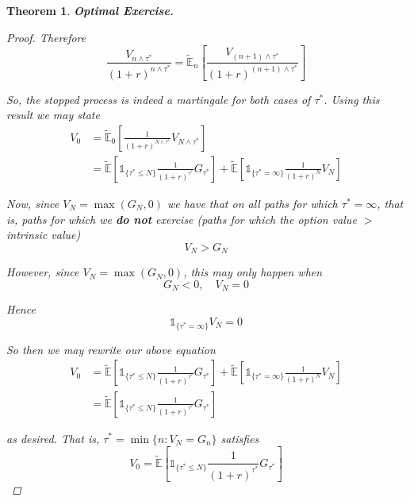 \documentclass[12pt]{article}
\newtheorem{theorem}{Theorem}
\newlength\tindent
\renewcommand{\indent}{\hspace*{\tindent}}
\newcommand{\E}{\mathbb E}
\begin{document}
\begin{theorem} {\bf Optimal Exercise.}
\begin{proof}
Therefore
\begin{equation*}
	\frac{ V_{n\land\tau^*} }{(1 + r)^{n\land\tau^*}} = \tilde{\E}_n\left[ \frac{V_{(n + 1)\land\tau^*}}{(1 + r)^{(n + 1)\land\tau^*}} \right]
\end{equation*}

\indent So, the stopped process is indeed a martingale for both cases of $\tau^*$. Using this result we may state
\begin{align*}
	V_0 &= \tilde{\E}_0 \left[ \frac{1}{(1 + r)^{N\land\tau^*}} V_{N\land\tau^*} \right] \\
	&= \tilde{\E} \left[ \mathds 1_{\{\tau^* \leq N \}} \frac{1}{(1 + r)^{\tau^*}} G_{\tau^*} \right] + \tilde{\E} \left[ \mathds 1_{\{\tau^* = \infty\}} \frac{1}{(1 + r)^N} V_N \right]
\end{align*}

\indent Now, since $V_N = \max(G_N, 0)$ we have that on all paths for which $\tau^* = \infty$, that is, paths for which we {\bf do not} exercise (paths for which the option value $>$ intrinsic value)
\begin{equation*}
	V_N > G_N
\end{equation*}

However, since $V_N = \max(G_N, 0)$, this may only happen when 
\begin{equation*}
	G_N < 0, \quad V_N = 0
\end{equation*}

Hence
\begin{equation*}
	\mathds 1_{\{\tau^* = \infty\}} V_N = 0
\end{equation*}

So then we may rewrite our above equation
\begin{align*}
	V_0 &= \tilde{\E} \left[ \mathds 1_{\{\tau^* \leq N \}} \frac{1}{(1 + r)^{\tau^*}} G_{\tau^*} \right] + \tilde{\E} \left[ \mathds 1_{\{\tau^* = \infty\}} \frac{1}{(1 + r)^N} V_N \right] \\
	&= \tilde{\E} \left[ \mathds 1_{\{\tau^* \leq N \}} \frac{1}{(1 + r)^{\tau^*}} G_{\tau^*} \right] 
\end{align*}

as desired. That is, $\tau^* = \min\{n:V_N = G_n\}$ satisfies
\begin{equation*}
	V_0 = \tilde{\E} \left[ \mathds 1_{\{\tau^* \leq N \}} \frac{1}{(1 + r)^{\tau^*}} G_{\tau^*} \right] 
\end{equation*}
\end{proof}
\end{theorem}
\end{document}
